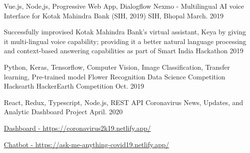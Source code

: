 

\begin{cventries}

  \cventry
    {Vue.js, Node,js, Progressive Web App, Dialogflow} %
    {Nexmo - Multilingual AI voice Interface for Kotak Mahindra Bank (SIH, 2019)} %
    {SIH, Bhopal} %
    {March. 2019} %
    {
      \begin{cvitems} %
        \item {Successfully improvised Kotak Mahindra Bank's virtual assistant, Keya by giving it multi-lingual voice capability; providing it a better natural language processing and context-based answering capabilities as part of Smart India Hackathon 2019}
      \end{cvitems}
    }
    \cventry
    {Python, Keras, Tensorflow, Computer Vision, Image Classification, Transfer learning, Pre-trained model} %
    {Flower Recognition Data Science Competition Hackearth} %
    {HackerEarth Competition} %
    {Oct. 2019} %
    {
      \begin{cvitems} %
      \end{cvitems}
    }

\cventry
    {React, Redux, Typescript, Node.js, REST API} %
    {Coronavirus News, Updates, and Analytic Dashboard} %
    {Project} %
    {April. 2020} %
    {
      \begin{cvitems} %
      \item \href{https://coronavirus2k19.netlify.app/}{Dashboard - \textcolor{mypink}{https://coronavirus2k19.netlify.app/}}
      \item \href{https://ask-me-anything-covid19.netlify.app/}{Chatbot - \textcolor{mypink}{https://ask-me-anything-covid19.netlify.app/}}
      \end{cvitems}
    }


\end{cventries}
